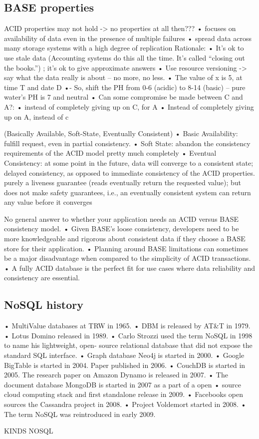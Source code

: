 \subsection{BASE properties}
ACID properties may not hold -> no properties at all then???
• focuses on availability of data even in the presence of multiple failures
• spread data across many storage systems with a high degree of replication
Rationale:
• It’s ok to use stale data (Accounting systems do this all the time. It’s called “closing out the books.”) ; it’s ok
to give approximate answers
• Use resource versioning -> say what the data really is about – no more, no less.
• The value of x is 5, at time T and date D
•- So, shift the PH from 0-6 (acidic) to 8-14 (basic) – pure water’s PH is 7 and neutral
• Can some compromise be made between C and A?:
• instead of completely giving up on C, for A
• Instead of completely giving up on A, instead of c


(Basically Available, Soft-State, Eventually Consistent)
• Basic Availability: fulfill request, even in partial consistency.
• Soft State: abandon the consistency requirements of the ACID model pretty much completely
• Eventual Consistency: at some point in the future, data will converge to a consistent state; delayed consistency, as opposed to immediate consistency of the ACID properties.  purely a liveness guarantee (reads eventually return the requested value); but does not make safety guarantees, i.e., an eventually consistent system can return any value before it converges

No general answer to whether your application needs an ACID versus BASE
consistency model.
• Given BASE’s loose consistency, developers need to be more knowledgeable
and rigorous about consistent data if they choose a BASE store for their
application.
• Planning around BASE limitations can sometimes be a major disadvantage
when compared to the simplicity of ACID transactions.
• A fully ACID database is the perfect fit for use cases where data reliability
and consistency are essential.

\subsection{NoSQL history}
• MultiValue databases at TRW in 1965.
• DBM is released by AT\&T in 1979.
• Lotus Domino released in 1989.
• Carlo Strozzi used the term NoSQL in 1998 to name his lightweight, open-
source relational database that did not expose the standard SQL interface.
• Graph database Neo4j is started in 2000.
• Google BigTable is started in 2004. Paper published in 2006.
• CouchDB is started in 2005.
The research paper on Amazon Dynamo is released in 2007.
• The document database MongoDB is started in 2007 as a part of a
open
• source cloud computing stack and first standalone release in 2009.
• Facebooks open sources the Cassandra project in 2008.
• Project Voldemort started in 2008.
• The term NoSQL was reintroduced in early 2009.

KINDS NOSQL

